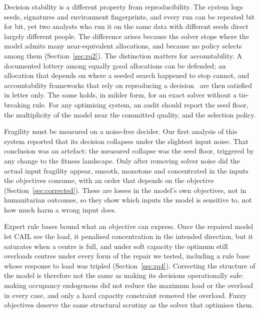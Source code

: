 \documentclass[systems,article,accept,moreauthors,pdftex]{Definitions/mdpi}
\begin{document}
Decision stability is a different property from reproducibility. The system logs seeds,
signatures and environment fingerprints, and every run can be repeated bit for bit, yet two
analysts who run it on the same data with different seeds direct largely different people. The
difference arises because the solver stops where the model admits many near-equivalent
allocations, and because no policy selects among them (Section~\ref{sec:rq2}). The distinction matters for
accountability. A documented lottery among equally good allocations can be defended; an
allocation that depends on where a seeded search happened to stop cannot, and accountability
frameworks that rely on reproducing a decision~\cite{kroll2017accountable} are then satisfied in
letter only. The same holds, in milder form, for an exact solver without a tie-breaking rule. For
any optimising system, an audit should report the seed floor, the multiplicity of the model near
the committed quality, and the selection policy.

Fragility must be measured on a noise-free decider. Our first analysis of this system reported
that its decision collapses under the slightest input noise. That conclusion was an artefact: the
measured collapse was the seed floor, triggered by any change to the fitness landscape. Only
after removing solver noise did the actual input fragility appear, smooth, monotone and
concentrated in the inputs the objectives consume, with an order that depends on the objective
(Section~\ref{sec:corrected}). These are losses in the model's own
objectives, not in humanitarian outcomes, so they show which inputs the model is sensitive to,
not how much harm a wrong input does.

Expert rule bases bound what an objective can express. Once the repaired model let CAIL see the
load, it penalised concentration in the intended direction, but it saturates when a centre is
full, and under soft capacity the optimum still overloads centres under every form of the repair
we tested, including a rule base whose response to load was tripled (Section~\ref{sec:rq4}).
Correcting the structure of the model is therefore not the same as making its decisions
operationally safe: making occupancy endogenous did not reduce the maximum load or the overload
in every case, and only a hard capacity constraint removed the overload. Fuzzy objectives deserve
the same structural scrutiny as the solver that optimises them.
\end{document}
